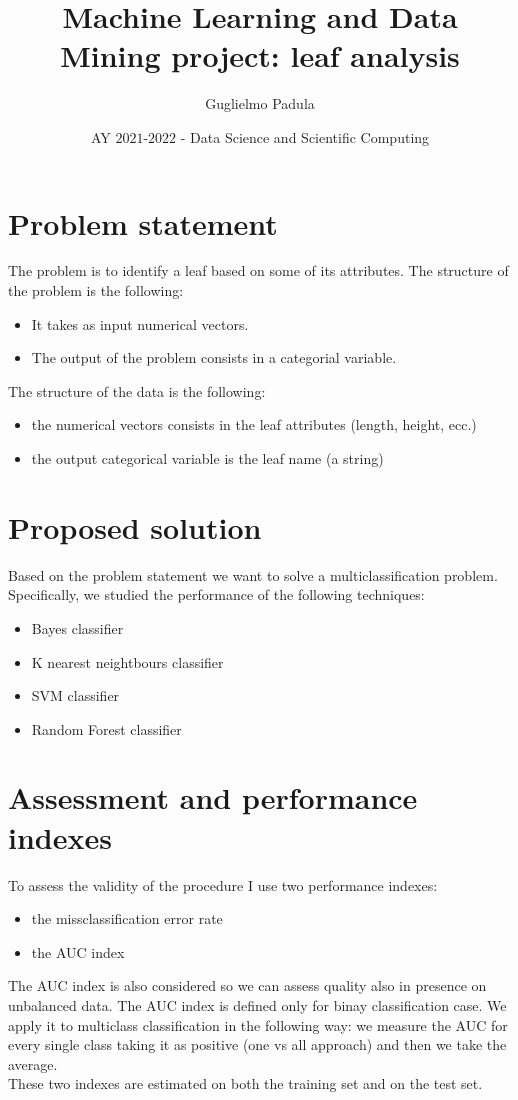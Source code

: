 \documentclass{article}
\title{Machine Learning and Data Mining project: leaf analysis}
\author{Guglielmo Padula}
\date{ AY $2021$-$2022$ - Data Science and Scientific Computing}
\begin{document}
\maketitle



\section{Problem statement}
The problem is to identify a leaf based on some of its attributes. 
The structure of the problem is the following:
\begin{itemize}
\item It takes as input  numerical vectors.
\item The output of the problem consists in a categorial variable.
\end{itemize}
The structure of the data is the following:
\begin{itemize}
\item the numerical vectors consists in the leaf attributes (length, height, ecc.)
\item the output categorical variable is the leaf name (a string)
\end{itemize}

\section{Proposed solution}
Based on the problem statement we want to solve a multiclassification problem. Specifically, we studied the performance of the following techniques:
\begin{itemize}
\item Bayes classifier
\item K nearest neightbours classifier
\item SVM classifier
\item Random Forest classifier
\end{itemize}

\section{Assessment and performance indexes}
To assess the validity of the procedure I use two performance indexes:
\begin{itemize}
\item the missclassification error rate 
\item the AUC index
\end{itemize}
The AUC index is also considered so we can assess quality also in presence on unbalanced data. The AUC index is defined only for binay classification case. We apply it to multiclass classification in the following way: we measure the AUC for every single class taking it as positive (one vs all approach) and then we take the average.\\
These two indexes are estimated on both the training set and on the test set.
\end{document}
